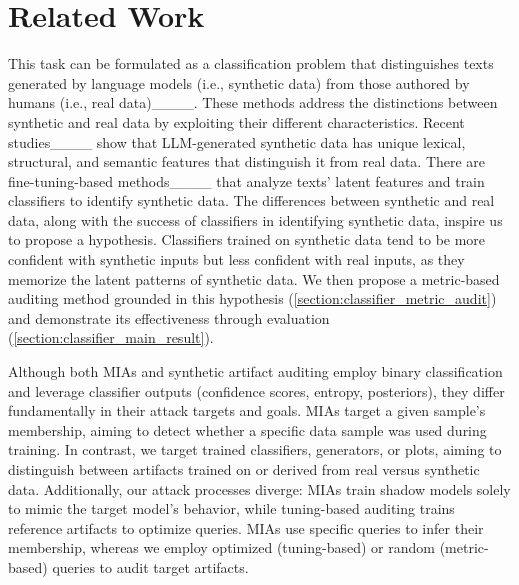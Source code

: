 \section{Related Work}
\label{section:related_work}

This task can be formulated as a classification problem that distinguishes texts generated by language models (i.e., synthetic data) from those authored by humans (i.e., real data)____.
These methods address the distinctions between synthetic and real data by exploiting their different characteristics.
Recent studies____ show that LLM-generated synthetic data has unique lexical, structural, and semantic features that distinguish it from real data.
There are fine-tuning-based methods____ that analyze texts' latent features and train classifiers to identify synthetic data.
The differences between synthetic and real data, along with the success of classifiers in identifying synthetic data, inspire us to propose a hypothesis.
Classifiers trained on synthetic data tend to be more confident with synthetic inputs but less confident with real inputs, as they memorize the latent patterns of synthetic data.
We then propose a metric-based auditing method grounded in this hypothesis (\autoref{section:classifier_metric_audit}) and demonstrate its effectiveness through evaluation (\autoref{section:classifier_main_result}).

Although both MIAs and synthetic artifact auditing employ binary classification and leverage classifier outputs (confidence scores, entropy, posteriors), they differ fundamentally in their attack targets and goals.
MIAs target a given sample's membership, aiming to detect whether a specific data sample was used during training.
In contrast, we target trained classifiers, generators, or plots, aiming to distinguish between artifacts trained on or derived from real versus synthetic data.
Additionally, our attack processes diverge: MIAs train shadow models solely to mimic the target model's behavior, while tuning-based auditing trains reference artifacts to optimize queries.
MIAs use specific queries to infer their membership, whereas we employ optimized (tuning-based) or random (metric-based) queries to audit target artifacts.


